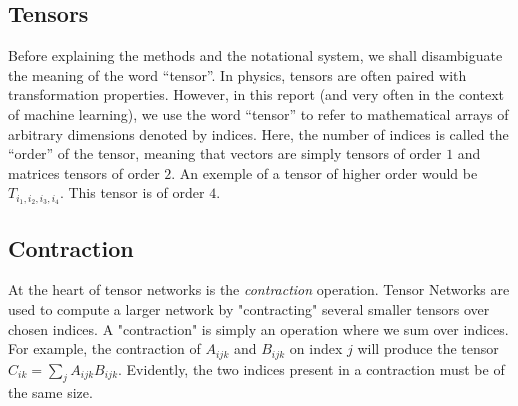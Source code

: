 \documentclass{article}
\theoremstyle{definition}
\theoremstyle{definition}
\begin{document}
\subsection{Tensors}
Before explaining the methods and the notational system, we shall disambiguate the meaning of the word \enquote{tensor}. In physics, tensors are often paired with transformation properties. 
However, in this report (and very often in the context of machine learning), we use the word \enquote{tensor} to refer to mathematical arrays of arbitrary dimensions denoted by indices. Here, the number of indices is called the \enquote{order} of the tensor, meaning that vectors are simply tensors of order $1$ and matrices tensors of order $2$. An exemple of a tensor of higher order would be $T_{i_1,i_2,i_3,i_4}$. This tensor is of order $4$.

\subsection{Contraction}
At the heart of tensor networks is the {\it contraction} operation.
Tensor Networks are used to compute a larger network by "contracting" several
smaller tensors over chosen indices. A "contraction" is simply an operation 
where we sum over indices. For example, the contraction of $A_{ijk}$ and 
$B_{ijk}$ on index $j$ will produce the tensor $C_{ik} = \sum_{j} A_{ijk} B_{ijk}$.
Evidently, the two indices present in a contraction must be of the same size.
\end{document}
